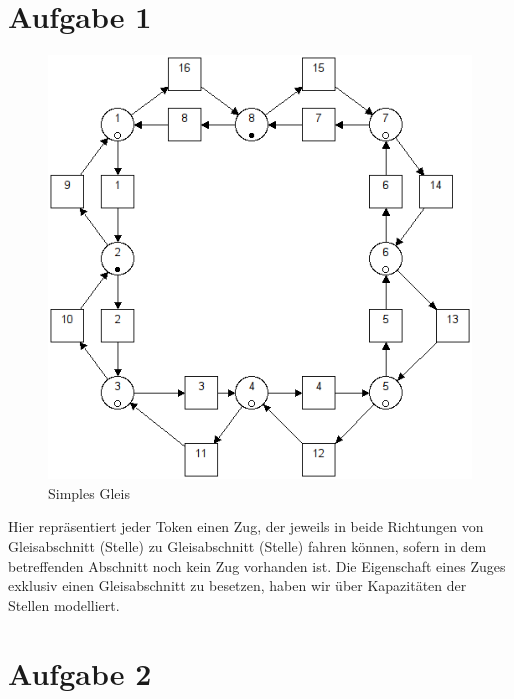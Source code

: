 \documentclass[10pt]{scrartcl}
\author{André Harms, Oliver Steenbuck}
\title{\titletext}
\date{04.04.2012}
\begin{document}
\maketitle

\setcounter{tocdepth}{3}
\tableofcontents

	\listoffigures  

\section{Aufgabe 1}
	\begin{figure}[H]
        \includegraphics[width=\textwidth]{aufgabe1.png}
        \caption{Simples Gleis}
        \label{img:aufg1}
	\end{figure}
	
	Hier repräsentiert jeder Token einen Zug, der jeweils in beide Richtungen von Gleisabschnitt (Stelle) zu Gleisabschnitt (Stelle) fahren können, sofern in dem betreffenden Abschnitt noch kein Zug vorhanden ist. Die Eigenschaft eines Zuges exklusiv einen Gleisabschnitt zu besetzen, haben wir über Kapazitäten der Stellen modelliert.
	
\section{Aufgabe 2}
\end{document}
